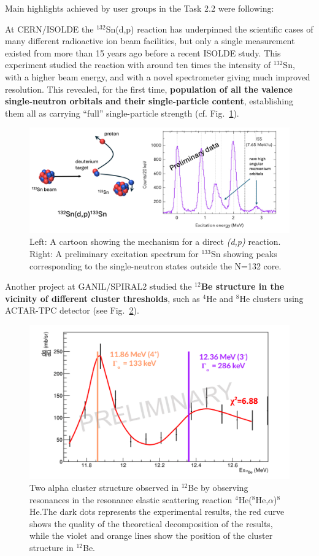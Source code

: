 Main highlights achieved by user groups in the Task 2.2 were following:

At CERN/ISOLDE the $^{132}$Sn(d,p) reaction has underpinned the scientific cases of many different radioactive ion beam facilities, but only a single measurement existed from more than 15 years ago before a recent ISOLDE study. This experiment studied the reaction with around ten times the intensity of $^{132}$Sn, with a higher beam energy, and with a novel spectrometer giving much improved resolution. This revealed, for the first time, \textbf{population of all the valence single-neutron orbitals and their single-particle content}, establishing them all as carrying “full” single-particle strength (cf. Fig.~\ref{fig:ISOLDE_Highlight_1}). 

\begin{figure}[!h]
    \centering
    \includegraphics[width=0.9\linewidth]{graphics/ISOLDE_highlight_1.png}
    \caption{Left: A cartoon showing the mechanism for a direct \textit{(d,p)} reaction.
Right: A preliminary excitation spectrum for $^{133}$Sn showing peaks corresponding to the single-neutron states outside the N=132 core.
}
    \label{fig:ISOLDE_Highlight_1}
\end{figure}

Another project at GANIL/SPIRAL2 studied the \textbf{$^{12}$Be structure in the vicinity of different cluster thresholds}, such as $^4$He and $^8$He clusters using ACTAR-TPC detector (see Fig.~\ref{fig:2alpha_cluster}). 

\begin{figure}[!h]
    \centering
    \includegraphics[width=0.6\linewidth]{graphics/2alpha_cluster.png}
    \caption{Two alpha cluster structure observed in $^{12}$Be by observing resonances in the resonance elastic scattering reaction $^4$He($^8$He,$\alpha$)$^8$He.The dark dots represents the experimental results, the red curve shows the quality of the theoretical decomposition of the results, while the violet and orange lines show the position of the cluster structure in $^{12}$Be.
}
    \label{fig:2alpha_cluster}
\end{figure}

